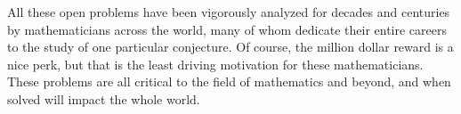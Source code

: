 \documentclass{article}
\begin{document}
All these open problems have been vigorously analyzed for decades and centuries by mathematicians across the world, many of whom dedicate their entire careers to the study of one particular conjecture. Of course, the million dollar reward is a nice perk, but that is the least driving motivation for these mathematicians. These problems are all critical to the field of mathematics and beyond, and when solved will impact the whole world.
\end{document}
